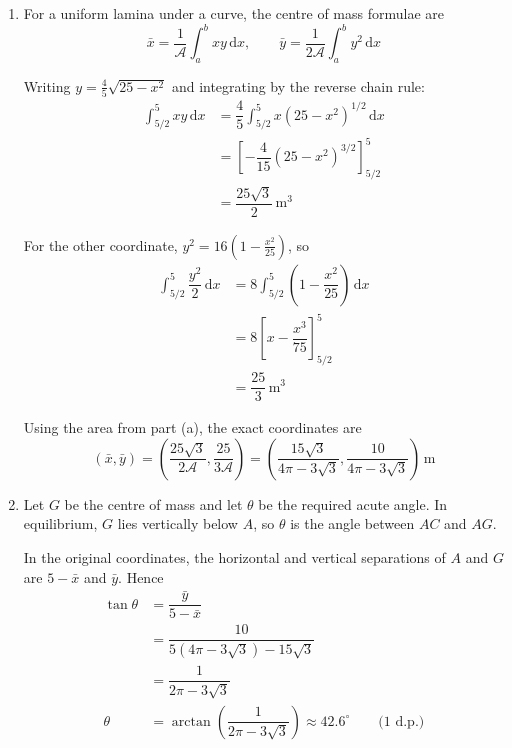\documentclass[leqno]{article}
\begin{document}
\begin{enumerate}[
  label=\textbf{\arabic*.},
  leftmargin=*,
  topsep=0pt,
  partopsep=0pt,
  parsep=0pt
]
\begin{djsSolution}
\begin{enumerate}[label=\textbf{(\alph*)}, start=1]
\item For a uniform lamina under a curve, the centre of mass formulae are
\[
\bar{x}=\frac{1}{\mathcal{A}}\int_a^b xy\,\mathrm{d}x,
\qquad
\bar{y}=\frac{1}{2\mathcal{A}}\int_a^b y^2\,\mathrm{d}x
\]

Writing \(y=\frac{4}{5}\sqrt{25-x^2}\) and integrating by the reverse chain rule:
\begin{align*}
\int_{5/2}^{5}xy\,\mathrm{d}x
&=\dfrac{4}{5}\int_{5/2}^{5}x(25-x^2)^{1/2}\,\mathrm{d}x\\
&=\left[-\dfrac{4}{15}(25-x^2)^{3/2}\right]_{5/2}^{5}\\
&=\dfrac{25\sqrt{3}}{2}\,\mathrm{m^3}
\end{align*}

For the other coordinate, \(y^2=16\left(1-\frac{x^2}{25}\right)\), so
\begin{align*}
\int_{5/2}^{5}\dfrac{y^2}{2}\,\mathrm{d}x
&=8\int_{5/2}^{5}\left(1-\dfrac{x^2}{25}\right)\,\mathrm{d}x\\
&=8\left[x-\dfrac{x^3}{75}\right]_{5/2}^{5}\\
&=\dfrac{25}{3}\,\mathrm{m^3}
\end{align*}

Using the area from part (a), the exact coordinates are
\[
(\bar{x},\bar{y})
=\left(\dfrac{25\sqrt{3}}{2\mathcal{A}},\dfrac{25}{3\mathcal{A}}\right)
=\left(\dfrac{15\sqrt{3}}{4\pi-3\sqrt{3}},\dfrac{10}{4\pi-3\sqrt{3}}\right)\,\mathrm{m}
\]

\item Let \(G\) be the centre of mass and let \(\theta\) be the required acute angle. In equilibrium, \(G\) lies vertically below \(A\), so \(\theta\) is the angle between \(AC\) and \(AG\).

In the original coordinates, the horizontal and vertical separations of \(A\) and \(G\) are \(5-\bar{x}\) and \(\bar{y}\). Hence
\begin{align*}
\tan\theta
&=\dfrac{\bar{y}}{5-\bar{x}}\\
&=\dfrac{10}{5(4\pi-3\sqrt{3})-15\sqrt{3}}\\
&=\dfrac{1}{2\pi-3\sqrt{3}}\\
\theta&=\arctan\left(\dfrac{1}{2\pi-3\sqrt{3}}\right)
\approx42.6^\circ\qquad\text{(1 d.p.)}
\end{align*}

\end{enumerate}
\end{djsSolution}

\newpage


\end{enumerate}
\end{document}
